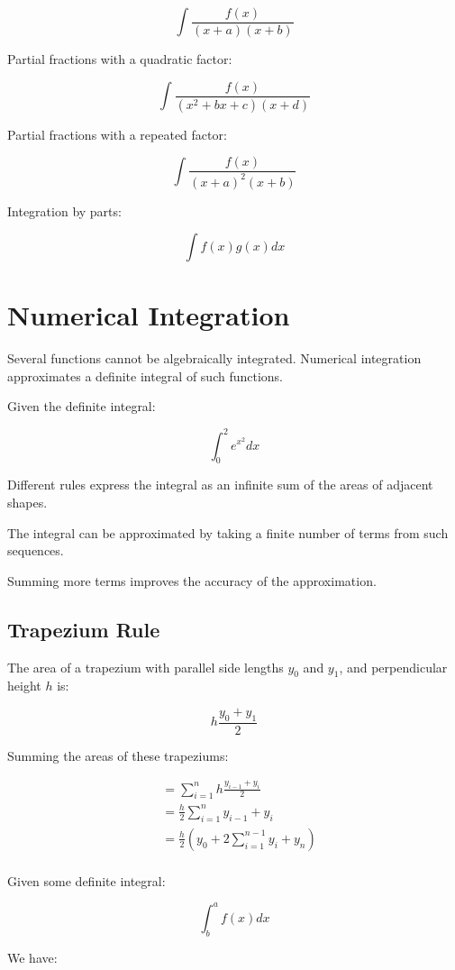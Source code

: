 \documentclass[a4paper,11pt]{article}
\begin{document}
$$
\int \frac{f(x)}{(x + a)(x + b)}
$$

Partial fractions with a quadratic factor:

$$
\int \frac{f(x)}{(x^2 + bx + c)(x + d)}
$$

Partial fractions with a repeated factor:

$$
\int \frac{f(x)}{(x + a)^2 (x + b)}
$$

Integration by parts:

$$
\int f(x)g(x) dx
$$




\section{Numerical Integration}

Several functions cannot be algebraically integrated.
Numerical integration approximates a definite integral of such functions.

Given the definite integral:

$$
\int^2_0 e^{x^2} dx
$$

Different rules express the integral as an infinite sum of the areas of adjacent
shapes.

The integral can be approximated by taking a finite number of terms from such
sequences.

Summing more terms improves the accuracy of the approximation.


\subsection{Trapezium Rule}

The area of a trapezium with parallel side lengths $y_0$ and $y_1$, and
perpendicular height $h$ is:

$$
h\frac{y_0 + y_1}{2}
$$

Summing the areas of these trapeziums:

$$
\begin{aligned}
& = \sum_{i = 1}^n h\frac{y_{i - 1} + y_i}{2} \\
& = \frac{h}{2} \sum_{i = 1}^n y_{i - 1} + y_i \\
& = \frac{h}{2} (y_0 + 2\sum_{i = 1}^{n - 1} y_i + y_n) \\
\end{aligned}
$$

Given some definite integral:

$$
\int^a_b f(x) dx
$$

We have:
\end{document}
